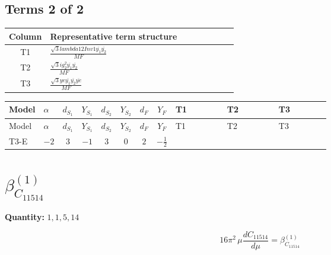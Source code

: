 \documentclass[8pt]{article}
\begin{document}
\begin{landscape}
\subsection*{Terms 2 of 2}
\begin{center}
\begin{tabular}{@{}c >{\raggedright\arraybackslash}p{0.82\linewidth}@{}}
\toprule
Column & Representative term structure \\
\midrule
T1 & \(\displaystyle \frac{\sqrt{3} lambda12Inv1 \overline{y_{1}} \overline{y_{2}}}{MF}\) \\
\midrule
T2 & \(\displaystyle \frac{\sqrt{3} i g_{2}^{2} \overline{y_{1}} \overline{y_{2}}}{MF}\) \\
\midrule
T3 & \(\displaystyle \frac{\sqrt{3} ye \overline{y_{1}} \overline{y_{2}} \overline{ye}}{MF}\) \\
\midrule
\bottomrule
\end{tabular}
\end{center}
\smallskip
\tiny
\begin{longtable}{@{}llcccccc >{\raggedright\arraybackslash}p{0.21\linewidth} >{\raggedright\arraybackslash}p{0.21\linewidth} >{\raggedright\arraybackslash}p{0.21\linewidth}@{}}
\toprule
Model & $\alpha$ & $d_{S_1}$ & $Y_{S_1}$ & $d_{S_2}$ & $Y_{S_2}$ & $d_F$ & $Y_F$ & T1 & T2 & T3 \\
\midrule
\endfirsthead
\toprule
Model & $\alpha$ & $d_{S_1}$ & $Y_{S_1}$ & $d_{S_2}$ & $Y_{S_2}$ & $d_F$ & $Y_F$ & T1 & T2 & T3 \\
\midrule
\endhead
T3-E & $-2$ & $3$ & $-1$ & $3$ & $0$ & $2$ & $-\frac{1}{2}$ & \scriptsize\adjustbox{max width=\linewidth}{$\begin{gathered} \frac{\sqrt{3} lambda12Inv1 \overline{y_{1}} \overline{y_{2}}}{6 MF}\end{gathered}$} & \scriptsize\adjustbox{max width=\linewidth}{$\begin{gathered} - \frac{\sqrt{3} i g_{2}^{2} \overline{y_{1}} \overline{y_{2}}}{6 MF}\end{gathered}$} & \scriptsize\adjustbox{max width=\linewidth}{$\begin{gathered} \frac{\sqrt{3} ye \overline{y_{1}} \overline{y_{2}} \overline{ye}}{12 MF}\end{gathered}$} \\
\midrule
\bottomrule
\end{longtable}
\clearpage
\section*{$\beta_{C_{11514}}^{(1)}$}
\noindent\textbf{Quantity: }$\mathrm{1,1,5,14}$\par\smallskip
\[16\pi^2\,\mu\frac{d C_{11514}}{d\mu}=\beta_{C_{11514}}^{(1)}\]

\end{landscape}
\end{document}
